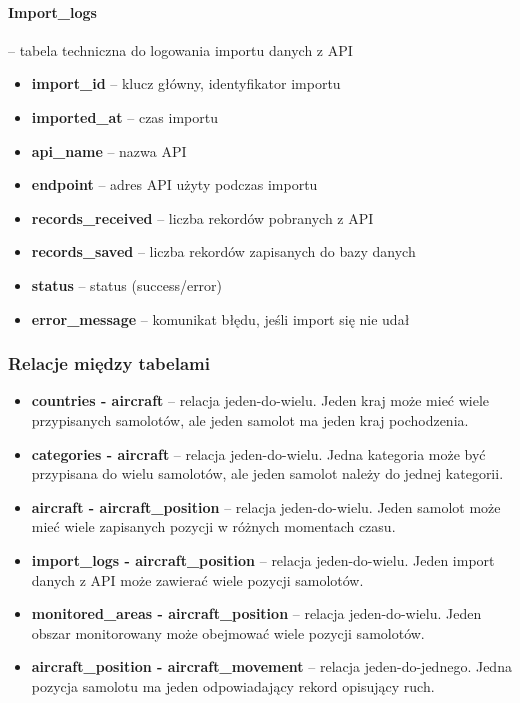 \documentclass[12pt,a4paper]{article}
\begin{document}
\paragraph{Import\_logs} – tabela techniczna do logowania importu danych z API
\begin{itemize}
    \item \textbf{import\_id} – klucz główny, identyfikator importu
    \item \textbf{imported\_at} – czas importu
    \item \textbf{api\_name} – nazwa API
    \item \textbf{endpoint} – adres API użyty podczas importu
    \item \textbf{records\_received} – liczba rekordów pobranych z API
    \item \textbf{records\_saved} – liczba rekordów zapisanych do bazy danych
    \item \textbf{status} – status (success/error)
    \item \textbf{error\_message} – komunikat błędu, jeśli import się nie udał
\end{itemize}

\subsubsection{Relacje między tabelami}
\begin{itemize}
    \item \textbf{countries - aircraft} – relacja jeden-do-wielu. Jeden kraj może mieć wiele przypisanych samolotów, ale jeden samolot ma jeden kraj pochodzenia.
    \item \textbf{categories - aircraft} – relacja jeden-do-wielu. Jedna kategoria może być przypisana do wielu samolotów, ale jeden samolot należy do jednej kategorii.
    \item \textbf{aircraft - aircraft\_position} – relacja jeden-do-wielu. Jeden samolot może mieć wiele zapisanych pozycji w różnych momentach czasu.
    \item \textbf{import\_logs - aircraft\_position} – relacja jeden-do-wielu. Jeden import danych z API może zawierać wiele pozycji samolotów.
    \item \textbf{monitored\_areas - aircraft\_position} – relacja jeden-do-wielu. Jeden obszar monitorowany może obejmować wiele pozycji samolotów.
    \item \textbf{aircraft\_position - aircraft\_movement} – relacja jeden-do-jednego. Jedna pozycja samolotu ma jeden odpowiadający rekord opisujący ruch.
\end{itemize}
\end{document}
